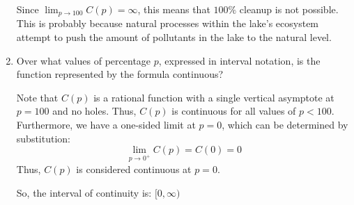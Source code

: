 \documentclass[letterpaper,12pt,fleqn]{article}
\begin{document}
\begin{enumerate}[label={(\alph*)}]
  \bigskip

  Since \(\displaystyle\lim_{p\to100}C(p)=\infty\), this means that \(100\%\) cleanup is not possible.  This is probably because
  natural processes within the lake's ecosystem attempt to push the amount of pollutants in the lake to the natural level.
  
  \bigskip
  
\item Over what values of percentage \(p\), expressed in interval notation, is the function represented by the formula
  continuous?

  Note that \(C(p)\) is a rational function with a single vertical asymptote at \(p=100\) and no holes.  Thus, \(C(p)\) is
  continuous for all values of \(p<100\).  Furthermore, we have a one-sided limit at \(p=0\), which can be determined by
  substitution:
  \[\lim_{p\to0^+}C(p)=C(0)=0\]
  Thus, \(C(p)\) is considered continuous at \(p=0\).

  So, the interval of continuity is: \([0,\infty)\)
\end{enumerate}
\end{document}
